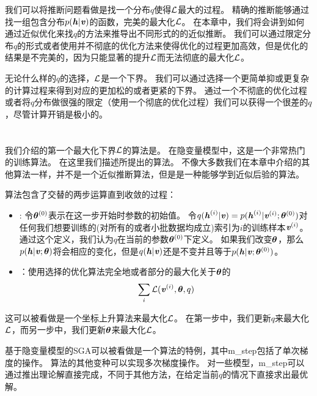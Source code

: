 我们可以将推断问题看做是找一个分布$q$使得$\mathcal{L}$最大的过程。
精确的推断能够通过找一组包含分布$p(\boldsymbol{\mathit{h}}\vert\boldsymbol{\mathit{v}})$的函数，完美的最大化$\mathcal{L}$。
在本章中，我们将会讲到如何通过近似优化来找$q$的方法来推导出不同形式的的近似推断。
我们可以通过限定分布$q$的形式或者使用并不彻底的优化方法来使得优化的过程更加高效，但是优化的结果是不完美的，因为只能显著的提升$\mathcal{L}$而无法彻底的最大化$\mathcal{L}$。


无论什么样的$q$的选择，$\mathcal{L}$是一个下界。
我们可以通过选择一个更简单抑或更复杂的计算过程来得到对应的更加松的或者更紧的下界。
通过一个不彻底的优化过程或者将$q$分布做很强的限定（使用一个彻底的优化过程）我们可以获得一个很差的$q$，尽管计算开销是极小的。


\section{}
\label{sec:expectation_maximization}

我们介绍的第一个最大化下界$\mathcal{L}$的算法是。
在隐变量模型中，这是一个非常热门的训练算法。
在这里我们描述\citet{emview}所提出的算法。
不像大多数我们在本章中介绍的其他算法一样，并不是一个近似推断算法，但是是一种能够学到近似后验的算法。


算法包含了交替的两步运算直到收敛的过程：
\begin{itemize}
	\item {}: 令${\boldsymbol{\theta}^{(0)}}$表示在这一步开始时参数的初始值。
	令$q(\boldsymbol{\mathit{h}}^{(i)}\vert \boldsymbol{\mathit{v}}) = p(\boldsymbol{\mathit{h}}^{(i)}\vert\boldsymbol{\mathit{v}}^{(i)};\boldsymbol{\theta}^{(0)})$对任何我们想要训练的(对所有的或者小批数据均成立)索引为$i$的训练样本$\boldsymbol{\mathit{v}}^{(i)}$。
	通过这个定义，我们认为$q$在当前的参数$\boldsymbol{\theta}^{(0)}$下定义。
	如果我们改变$\boldsymbol{\theta}$，那么$p(\boldsymbol{\mathit{h}}\vert\boldsymbol{\mathit{v}};\boldsymbol{\theta})$将会相应的变化，但是$q(\boldsymbol{\mathit{h}}\vert\boldsymbol{\mathit{v}})$还是不变并且等于$p(\boldsymbol{\mathit{h}}\vert\boldsymbol{\mathit{v}};\boldsymbol{\theta}^{(0)})$。
	\item {}：使用选择的优化算法完全地或者部分的最大化关于$\boldsymbol{\theta}$的
	\begin{align}
	\sum_i \mathcal{L}(\boldsymbol{\mathit{v}}^{(i)},\boldsymbol{\theta},q)
	\end{align}
\end{itemize}


这可以被看做是一个坐标上升算法来最大化$\mathcal{L}$。
在第一步中，我们更新$q$来最大化$\mathcal{L}$，而另一步中，我们更新$\boldsymbol{\theta}$来最大化$\mathcal{L}$。


基于隐变量模型的\gls{SGA}可以被看做是一个算法的特例，其中\gls{m_step}包括了单次梯度的操作。
算法的其他变种可以实现多次梯度操作。
对一些模型，\gls{m_step}可以通过推出理论解直接完成，不同于其他方法，在给定当前$q$的情况下直接求出最优解。


